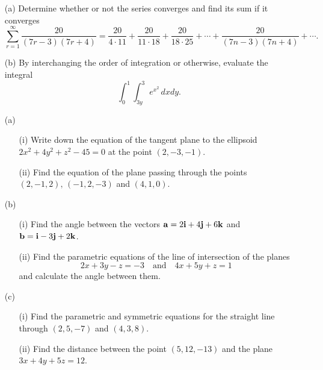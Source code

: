 \documentclass[12pt]{uz-exame}
\begin{document}
\begin{question}
\begin{itemize}
\item[(a)] Determine whether or not the series converges and find its sum if it converges
\[\sum _{r=1}^\infty \dfrac{20}{(7r-3)(7r+4)}=\dfrac{20}{4\cdot 11}+\dfrac{20}{11\cdot 18}+\dfrac{20}{18\cdot 25}+\cdots +\dfrac{20}{(7n-3)(7n+4)} +\cdots .\]
\item[(b)] By interchanging the order of integration or otherwise, evaluate the integral \[ \int _{0}^1\int _{3y}^3 e^{x^2}\, dxdy.\]
\end{itemize}
\end{question}
\sectionBscience
\begin{question}
\begin{itemize}
\item[(a)] \begin{itemize}
\item[(i)] Write down the equation of the tangent plane to the ellipsoid \\ $2x^2+4y^2+z^2-45=0$ at the point $(2,-3,-1)$. 
\item[(ii)] Find the equation of the plane passing through the points\\ $(2,-1,2), \, (-1,2,-3)$ and $(4,1,0)$. 
\end{itemize}
\item[(b)]
\begin{itemize}
\item[(i)] Find the angle between the vectors ${\bf{a}}=2{\bf{i}}+4{\bf{j}}+6{\bf{k}}$ and ${\bf{b}}={\bf{i}}-3{\bf{j}}+2{\bf{k}}$. 
\item[(ii)] Find the parametric equations of the line of intersection of the planes 
\[2x+3y-z=-3 \quad \mbox{and} \quad 4x+5y+z=1\] and calculate the angle between them. 
\end{itemize}
\item[(c)] \begin{itemize}
\item[(i)] Find the parametric and symmetric equations for the straight line through $(2,5,-7)$ and $(4,3,8)$. 
\item[(ii)] Find the distance between the point $(5,12,-13)$ and the plane\\ $3x+4y+5z=12$. 
\end{itemize}
\end{itemize}
\end{question}
\end{document}
